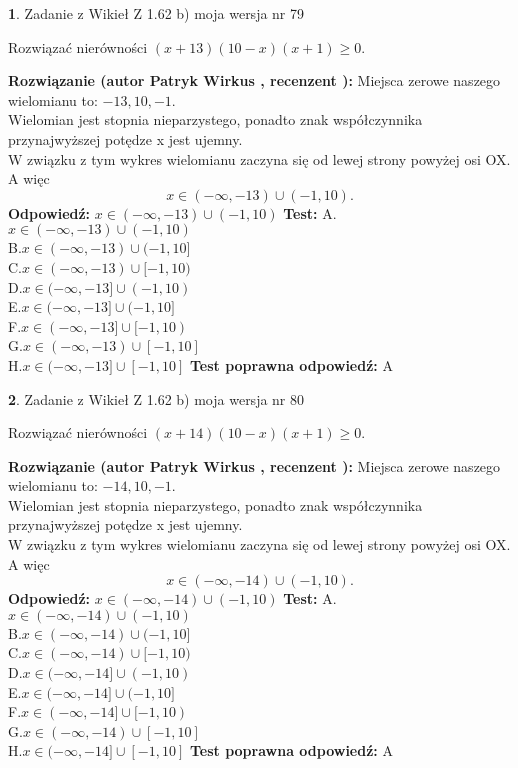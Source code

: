 \documentclass[12pt, a4paper]{article}
\theoremstyle{definition} %
\newtheorem{zad}{}
\newcommand{\zadStart}[1]{\begin{zad}#1\newline}
\newcommand{\zadStop}{\end{zad}}
\newcommand{\rozwStart}[2]{\noindent \textbf{Rozwiązanie (autor #1 , recenzent #2): }\newline}
\newcommand{\rozwStop}{\newline}
\newcommand{\odpStart}{\noindent \textbf{Odpowiedź:}\newline}
\newcommand{\odpStop}{\newline}
\newcommand{\testStart}{\noindent \textbf{Test:}\newline}
\newcommand{\testStop}{\newline}
\newcommand{\kluczStart}{\noindent \textbf{Test poprawna odpowiedź:}\newline}
\newcommand{\kluczStop}{\newline}
\begin{document}
\zadStart{Zadanie z Wikieł Z 1.62 b) moja wersja nr 79}

Rozwiązać nierówności $(x+13)(10-x)(x+1)\ge0$.
\zadStop
\rozwStart{Patryk Wirkus}{}
Miejsca zerowe naszego wielomianu to: $-13, 10, -1$.\\
Wielomian jest stopnia nieparzystego, ponadto znak współczynnika przy\linebreak najwyższej potędze x jest ujemny.\\ W związku z tym wykres wielomianu zaczyna się od lewej strony powyżej osi OX. A więc $$x \in (-\infty,-13) \cup (-1,10).$$
\rozwStop
\odpStart
$x \in (-\infty,-13) \cup (-1,10)$
\odpStop
\testStart
A.$x \in (-\infty,-13) \cup (-1,10)$\\
B.$x \in (-\infty,-13) \cup (-1,10]$\\
C.$x \in (-\infty,-13) \cup [-1,10)$\\
D.$x \in (-\infty,-13] \cup (-1,10)$\\
E.$x \in (-\infty,-13] \cup (-1,10]$\\
F.$x \in (-\infty,-13] \cup [-1,10)$\\
G.$x \in (-\infty,-13) \cup [-1,10]$\\
H.$x \in (-\infty,-13] \cup [-1,10]$
\testStop
\kluczStart
A
\kluczStop



\zadStart{Zadanie z Wikieł Z 1.62 b) moja wersja nr 80}

Rozwiązać nierówności $(x+14)(10-x)(x+1)\ge0$.
\zadStop
\rozwStart{Patryk Wirkus}{}
Miejsca zerowe naszego wielomianu to: $-14, 10, -1$.\\
Wielomian jest stopnia nieparzystego, ponadto znak współczynnika przy\linebreak najwyższej potędze x jest ujemny.\\ W związku z tym wykres wielomianu zaczyna się od lewej strony powyżej osi OX. A więc $$x \in (-\infty,-14) \cup (-1,10).$$
\rozwStop
\odpStart
$x \in (-\infty,-14) \cup (-1,10)$
\odpStop
\testStart
A.$x \in (-\infty,-14) \cup (-1,10)$\\
B.$x \in (-\infty,-14) \cup (-1,10]$\\
C.$x \in (-\infty,-14) \cup [-1,10)$\\
D.$x \in (-\infty,-14] \cup (-1,10)$\\
E.$x \in (-\infty,-14] \cup (-1,10]$\\
F.$x \in (-\infty,-14] \cup [-1,10)$\\
G.$x \in (-\infty,-14) \cup [-1,10]$\\
H.$x \in (-\infty,-14] \cup [-1,10]$
\testStop
\kluczStart
A
\kluczStop
\end{document}
